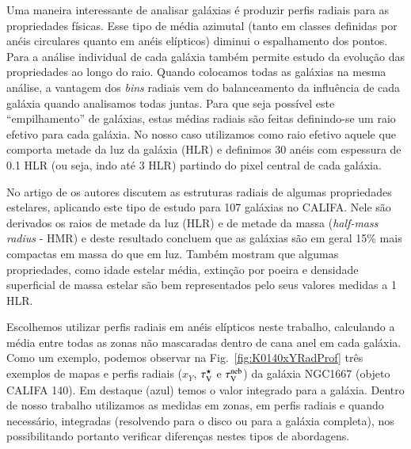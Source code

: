 Uma maneira interessante de analisar galáxias é produzir perfis radiais para as propriedades
físicas. Esse tipo de média azimutal (tanto em classes definidas por anéis circulares quanto em
anéis elípticos) diminui o espalhamento dos pontos. Para a análise individual de cada galáxia também
permite estudo da evolução das propriedades ao longo do raio. Quando colocamos todas as galáxias na
mesma análise, a vantagem dos {\em bins} radiais vem do balanceamento da influência de cada galáxia
quando analisamos todas juntas. Para que seja possível este ``empilhamento'' de galáxias, estas
médias radiais são feitas definindo-se um raio efetivo para cada galáxia. No nosso caso utilizamos
como raio efetivo aquele que comporta metade da luz da galáxia (HLR) e definimos 30 anéis com
espessura de 0.1 HLR (ou seja, indo até 3 HLR) partindo do pixel central de cada galáxia.

No artigo de \citet{GonzalezDelgado.etal.2014a} os autores discutem as estruturas radiais de algumas
propriedades estelares, aplicando este tipo de estudo para 107 galáxias no CALIFA. Nele são
derivados os raios de metade da luz (HLR) e de metade da massa ({\em half-mass radius} - HMR) e
deste resultado concluem que as galáxias são em geral 15\% mais compactas em massa do que em luz.
Também mostram que algumas propriedades, como idade estelar média, extinção por poeira e densidade
superficial de massa estelar são bem representados pelo seus valores medidas a 1 HLR.

Escolhemos utilizar perfis radiais em anéis elípticos neste trabalho, calculando a média entre todas
as zonas não mascaradas dentro de cana anel em cada galáxia. Como um exemplo, podemos observar na
Fig.\ \ref{fig:K0140xYRadProf} três exemplos de mapas e perfis radiais ($x_Y$, $\tau_{\mathrm{V}}^\star$ e $\tau_{\mathrm{V}}^{\mathrm{neb}}$)
da galáxia NGC1667 (objeto CALIFA 140). Em destaque (azul) temos o valor integrado para a galáxia.
Dentro de nosso trabalho utilizamos as medidas em zonas, em perfis radiais e quando necessário,
integradas (resolvendo para o disco ou para a galáxia completa), nos possibilitando portanto
verificar diferenças nestes tipos de abordagens.

